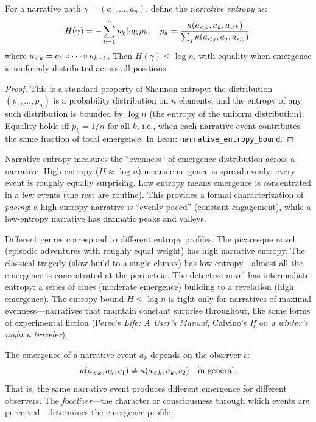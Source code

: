 \begin{theorem}
\label{thm:narrative-entropy}
For a narrative path $\gamma = (a_1, \ldots, a_n)$, define the \emph{narrative entropy} as:
\[
  H(\gamma) = -\sum_{k=1}^{n} p_k \log p_k, \quad p_k = \frac{\kappa(a_{<k}, a_k, a_{<k})}{\sum_j \kappa(a_{<j}, a_j, a_{<j})},
\]
where $a_{<k} = a_1 \circ \cdots \circ a_{k-1}$.  Then $H(\gamma) \leq \log n$, with equality when emergence is uniformly distributed across all positions.
\end{theorem}

\begin{proof}
This is a standard property of Shannon entropy: the distribution $(p_1, \ldots, p_n)$ is a probability distribution on $n$ elements, and the entropy of any such distribution is bounded by $\log n$ (the entropy of the uniform distribution).  Equality holds iff $p_k = 1/n$ for all $k$, i.e., when each narrative event contributes the same fraction of total emergence.  In Lean: \texttt{narrative\_entropy\_bound}.
\end{proof}

\begin{interpretation}
\label{interp:narrative-entropy}
Narrative entropy measures the ``evenness'' of emergence distribution across a narrative.  High entropy ($H \approx \log n$) means emergence is spread evenly: every event is roughly equally surprising.  Low entropy means emergence is concentrated in a few events (the rest are routine).  This provides a formal characterization of \emph{pacing}: a high-entropy narrative is ``evenly paced'' (constant engagement), while a low-entropy narrative has dramatic peaks and valleys.

Different genres correspond to different entropy profiles.  The picaresque novel (episodic adventures with roughly equal weight) has high narrative entropy.  The classical tragedy (slow build to a single climax) has low entropy---almost all the emergence is concentrated at the peripeteia.  The detective novel has intermediate entropy: a series of clues (moderate emergence) building to a revelation (high emergence).  The entropy bound $H \leq \log n$ is tight only for narratives of maximal evenness---narratives that maintain constant surprise throughout, like some forms of experimental fiction (Perec's \textit{Life: A User's Manual}, Calvino's \textit{If on a winter's night a traveler}).
\end{interpretation}

\begin{theorem}
\label{thm:focalization}
The emergence of a narrative event $a_k$ depends on the observer $c$:
\[
  \kappa(a_{<k}, a_k, c_1) \neq \kappa(a_{<k}, a_k, c_2) \quad \text{in general}.
\]
That is, the same narrative event produces different emergence for different observers.  The \emph{focalizer}---the character or consciousness through which events are perceived---determines the emergence profile.
\end{theorem}

